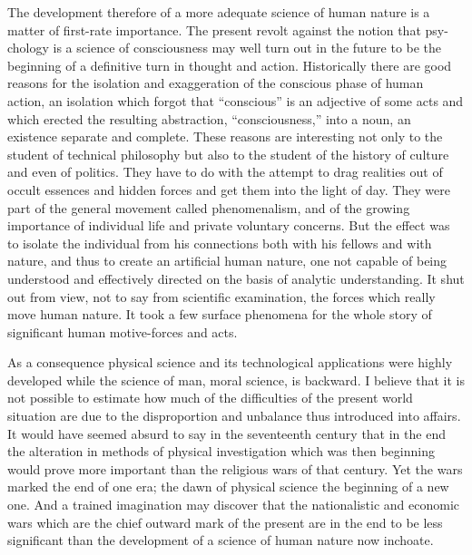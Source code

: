 The development therefore of a more adequate science of human nature
is a matter of first-rate importance. The present revolt against the
notion that psy-chology is a science of consciousness may
well turn out in the future to be the beginning of a definitive turn
in thought and action. Historically there are good reasons for the
isolation and exaggeration of the conscious phase of human action, an
isolation which forgot that ``conscious'' is an adjective of some acts
and which erected the resulting abstraction, ``consciousness,'' into a
noun, an existence separate and complete. These reasons are
interesting not only to the student of technical philosophy but also
to the student of the history of culture and even of politics. They
have to do with the attempt to drag realities out of occult essences
and hidden forces and get them into the light of day. They were part
of the general movement called phenomenalism, and of the growing
importance of individual life and private voluntary concerns. But the
effect was to isolate the individual from his connections both with
his fellows and with nature, and thus to create an artificial human
nature, one not capable of being understood and effectively directed
on the basis of analytic understanding. It shut out from view, not to
say from scientific examination, the forces which really move human
nature. It took a few surface phenomena for the whole story of
significant human motive-forces and acts.

As a consequence physical science and its technological applications
were highly developed while the science of man, moral science, is
backward. I believe that it is not possible to estimate how much of
the difficulties of the present world situation are due to the
 disproportion and unbalance thus introduced into affairs.
It would have seemed absurd to say in the seventeenth century that in
the end the alteration in methods of physical investigation which was
then beginning would prove more important than the religious wars of
that century. Yet the wars marked the end of one era; the dawn of
physical science the beginning of a new one. And a trained imagination
may discover that the nationalistic and economic wars which are the
chief outward mark of the present are in the end to be less
significant than the development of a science of human nature now
inchoate.

